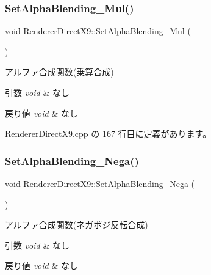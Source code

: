 \subsubsection{\texorpdfstring{Set\+Alpha\+Blending\+\_\+\+Mul()}{SetAlphaBlending\_Mul()}}
{\footnotesize\ttfamily void Renderer\+Direct\+X9\+::\+Set\+Alpha\+Blending\+\_\+\+Mul (\begin{DoxyParamCaption}{ }\end{DoxyParamCaption})}



アルファ合成関数(乗算合成) 


\begin{DoxyParams}{引数}
{\em void} & なし \\
\hline
\end{DoxyParams}

\begin{DoxyRetVals}{戻り値}
{\em void} & なし \\
\hline
\end{DoxyRetVals}


 Renderer\+Direct\+X9.\+cpp の 167 行目に定義があります。

\mbox{\label{class_renderer_direct_x9_a5018efa829bf845405ac70beef7df947}} 
\subsubsection{\texorpdfstring{Set\+Alpha\+Blending\+\_\+\+Nega()}{SetAlphaBlending\_Nega()}}
{\footnotesize\ttfamily void Renderer\+Direct\+X9\+::\+Set\+Alpha\+Blending\+\_\+\+Nega (\begin{DoxyParamCaption}{ }\end{DoxyParamCaption})}



アルファ合成関数(ネガポジ反転合成) 


\begin{DoxyParams}{引数}
{\em void} & なし \\
\hline
\end{DoxyParams}

\begin{DoxyRetVals}{戻り値}
{\em void} & なし \\
\hline
\end{DoxyRetVals}



